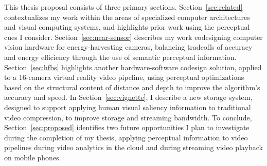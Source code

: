 This thesis proposal consists of three primary sections.
Section~\ref{sec:related} contextualizes my work within the areas of specialized computer architectures and visual computing systems, and highlights prior work using the perceptual cues I consider.
Section~\ref{sec:near-sensor} describes my work codesigning computer vision hardware for energy-harvesting cameras, balancing tradeoffs of accuracy and energy efficiency through the use of semantic perceptual information.
Section~\ref{sec:hfbs} highlights another hardware-software codesign solution, applied to a 16-camera virtual reality video pipeline, using perceptual optimizations based on the structural content of distance and depth to improve the algorithm's accuracy and speed.
In Section~\ref{sec:vignette}, I describe a new storage system, designed to support applying human visual saliency information to traditional video compression, to improve storage and streaming bandwidth.
To conclude, Section~\ref{sec:proposed} identifies two future opportunities I plan to investigate during the completion of my thesis, applying perceptual information to video pipelines during video analytics in the cloud and during streaming video playback on mobile phones.


